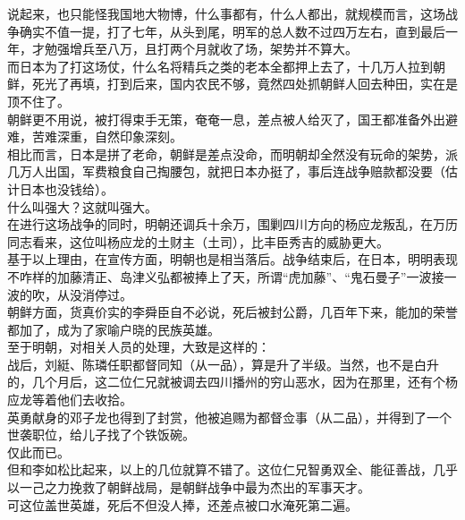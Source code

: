 \begin{multicols}{\theparacolNo}
说起来，也只能怪我国地大物博，什么事都有，什么人都出，就规模而言，这场战争确实不值一提，打了七年，从头到尾，明军的总人数不过四万左右，直到最后一年，才勉强增兵至八万，且打两个月就收了场，架势并不算大。\\

而日本为了打这场仗，什么名将精兵之类的老本全都押上去了，十几万人拉到朝鲜，死光了再填，打到后来，国内农民不够，竟然四处抓朝鲜人回去种田，实在是顶不住了。\\

朝鲜更不用说，被打得束手无策，奄奄一息，差点被人给灭了，国王都准备外出避难，苦难深重，自然印象深刻。\\

相比而言，日本是拼了老命，朝鲜是差点没命，而明朝却全然没有玩命的架势，派几万人出国，军费粮食自己掏腰包，就把日本办挺了，事后连战争赔款都没要（估计日本也没钱给）。\\

什么叫强大？这就叫强大。\\

在进行这场战争的同时，明朝还调兵十余万，围剿四川方向的杨应龙叛乱，在万历同志看来，这位叫杨应龙的土财主（土司），比丰臣秀吉的威胁更大。\\

基于以上理由，在宣传方面，明朝也是相当落后。战争结束后，在日本，明明表现不咋样的加藤清正、岛津义弘都被捧上了天，所谓“虎加藤”、“鬼石曼子”一波接一波的吹，从没消停过。\\

朝鲜方面，货真价实的李舜臣自不必说，死后被封公爵，几百年下来，能加的荣誉都加了，成为了家喻户晓的民族英雄。\\

至于明朝，对相关人员的处理，大致是这样的：\\

战后，刘綎、陈璘任职都督同知（从一品），算是升了半级。当然，也不是白升的，几个月后，这二位仁兄就被调去四川播州的穷山恶水，因为在那里，还有个杨应龙等着他们去收拾。\\

英勇献身的邓子龙也得到了封赏，他被追赐为都督佥事（从二品），并得到了一个世袭职位，给儿子找了个铁饭碗。\\

仅此而已。\\

但和李如松比起来，以上的几位就算不错了。这位仁兄智勇双全、能征善战，几乎以一己之力挽救了朝鲜战局，是朝鲜战争中最为杰出的军事天才。\\

可这位盖世英雄，死后不但没人捧，还差点被口水淹死第二遍。\\


\end{multicols}
